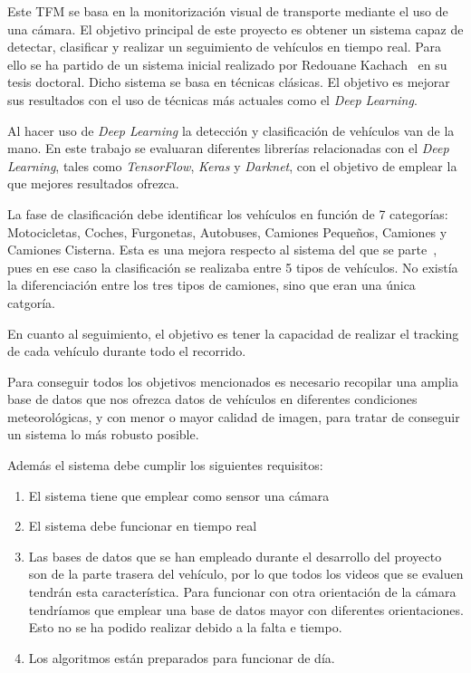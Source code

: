 Este TFM se basa en la monitorización visual de transporte mediante el uso de una cámara. El objetivo principal de este proyecto es obtener un sistema capaz de detectar, clasificar y realizar un seguimiento de vehículos en tiempo real. Para ello se ha partido de un sistema inicial realizado por Redouane Kachach~\cite{redo_tesis} en su tesis doctoral. Dicho sistema se basa en técnicas clásicas. El objetivo es mejorar sus resultados con el uso de técnicas más actuales como el \textit{Deep Learning}.

Al hacer uso de \textit{Deep Learning} la detección y clasificación de vehículos van de la mano. En este trabajo se evaluaran diferentes  librerías relacionadas con el \textit{Deep Learning}, tales como \textit{TensorFlow}, \textit{Keras} y \textit{Darknet}, con el objetivo de emplear la que mejores resultados ofrezca.

La fase de clasificación debe identificar los vehículos en función de 7 categorías: Motocicletas, Coches, Furgonetas, Autobuses, Camiones Pequeños, Camiones y Camiones Cisterna. Esta es una mejora respecto al sistema del que se parte~\cite{redo_tesis}, pues en ese caso la clasificación se realizaba entre 5 tipos de vehículos. No existía la diferenciación entre los tres tipos de camiones, sino que eran una única catgoría.

En cuanto al seguimiento, el objetivo es tener la capacidad de realizar el tracking de cada vehículo durante todo el recorrido.

Para conseguir todos los objetivos mencionados es necesario recopilar una amplia base de datos que nos ofrezca datos de vehículos en diferentes condiciones meteorológicas, y con menor o mayor calidad de imagen, para tratar de conseguir un sistema lo más robusto posible.

Además el sistema debe cumplir los siguientes requisitos:
\begin{enumerate}
    \item El sistema tiene que emplear como sensor una cámara
    \item El sistema debe funcionar en tiempo real
    \item Las bases de datos que se han empleado durante el desarrollo del proyecto son de la parte trasera del vehículo, por lo que todos los videos que se evaluen tendrán esta característica. Para funcionar con otra orientación de la cámara tendríamos que emplear una base de datos mayor con diferentes orientaciones. Esto no se ha podido realizar debido a la falta e tiempo.
    \item  Los algoritmos están preparados para funcionar de día.
\end{enumerate}

